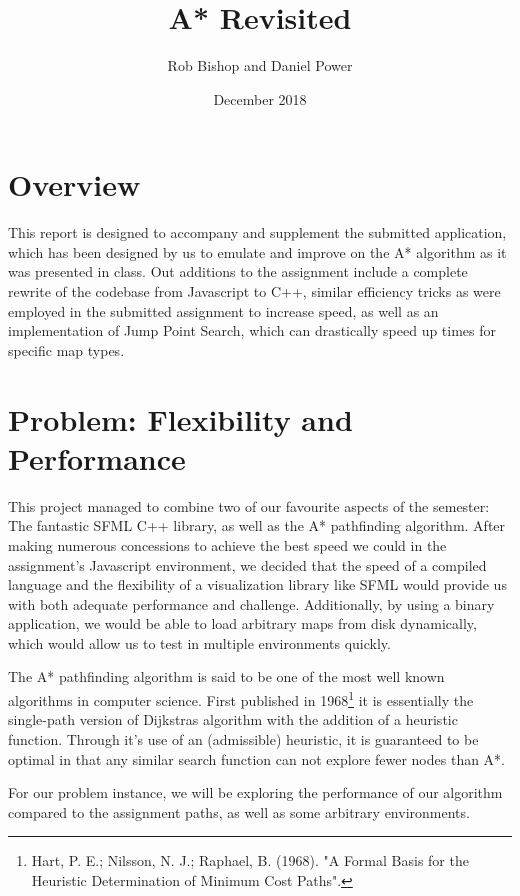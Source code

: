 \documentclass{article}
\title{A* Revisited}
\author{Rob Bishop and Daniel Power }
\date{December 2018}
\begin{document}
\maketitle

\section{Overview}
This report is designed to accompany and supplement the submitted application, which has been designed by us to emulate and improve on the A* algorithm as it was presented in class. Out additions to the assignment include a complete rewrite of the codebase from Javascript to C++, similar efficiency tricks as were employed in the submitted assignment to increase speed, as well as an implementation of Jump Point Search, which can drastically speed up times for specific map types.

\section{Problem: Flexibility and Performance}
This project managed to combine two of our favourite aspects of the semester: The fantastic SFML C++ library, as well as the A* pathfinding algorithm. After making numerous concessions to achieve the best speed we could in the assignment's Javascript environment, we decided that the speed of a compiled language and the flexibility of a visualization library like SFML would provide us with both adequate performance and challenge. Additionally, by using a binary application, we would be able to load arbitrary maps from disk dynamically, which would allow us to test in multiple environments quickly.

The A* pathfinding algorithm is said to be one of the most well known algorithms in computer science. First published in 1968\footnote{Hart, P. E.; Nilsson, N. J.; Raphael, B. (1968). "A Formal Basis for the Heuristic Determination of Minimum Cost Paths". } it is essentially the single-path version of Dijkstras algorithm with the addition of a heuristic function. Through it's use of an (admissible) heuristic, it is guaranteed to be optimal in that any similar search function can not explore fewer nodes than A*.

For our problem instance, we will be exploring the performance of our algorithm compared to the assignment paths, as well as some arbitrary environments.
\end{document}
